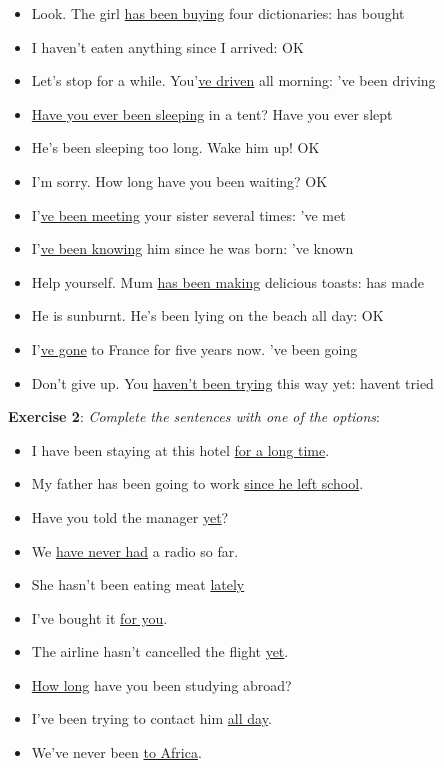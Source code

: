 \begin{itemize}

\item Look. The girl \underline{has been buying} four dictionaries: has bought
\item I haven't eaten anything since I arrived: OK
\item Let's stop for a while. You'\underline{ve driven} all morning: 've been driving
\item \underline{Have you ever been sleeping} in a tent? Have you ever slept
\item He's been sleeping too long. Wake him up! OK
\item I'm sorry. How long have you been waiting? OK
\item I'\underline{ve been meeting} your sister several times: 've met
\item I'\underline{ve been knowing} him since he was born: 've known
\item Help yourself. Mum \underline{has been making} delicious toasts: has made
\item He is sunburnt. He's been lying on the beach all day: OK
\item I'\underline{ve gone} to France for five years now. 've been going
\item Don't give up. You \underline{haven't been trying} this way yet: havent tried

\end{itemize}

\textbf{Exercise 2}: \textit{Complete the sentences with one of the options}:

\begin{itemize}

\item I have been staying at this hotel \underline{for a long time}.
\item My father has been going to work \underline{since he left school}.
\item Have you told the manager \underline{yet}?
\item We \underline{have never had} a radio so far.
\item She hasn't been eating meat \underline{lately}
\item I've bought it \underline{for you}.
\item The airline hasn't cancelled the flight \underline{yet}.
\item \underline{How long} have you been studying abroad?
\item I've been trying to contact him \underline{all day}.
\item We've never been \underline{to Africa}.

\end{itemize}

